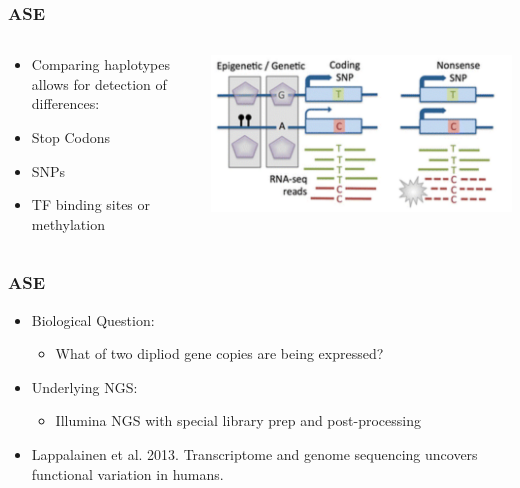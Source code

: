 \documentclass[14pt]{beamer}
\begin{document}
\begin{frame}
\frametitle{ASE}
\begin{columns}
	\begin{column}{0.4\textwidth}
		\begin{itemize}
			\item<+-> Comparing haplotypes allows for detection of differences:
			\item<+-> Stop Codons
			\item<+-> SNPs
			\item<+-> TF binding sites or methylation
		\end{itemize}
		\end{column}
	\begin{column}{0.6\textwidth}
		\begin{center}
     		\includegraphics[width=1\textwidth]{images_20170926_ASE.png}
     	\end{center}
	\end{column}
\end{columns}
\end{frame}

\begin{frame}
\frametitle{ASE}
\begin{itemize}
	\item<+-> Biological Question:
	\begin{itemize}
		\item<+-> What of two dipliod gene copies are being expressed?
	\end{itemize}
	\item<+-> Underlying NGS:
	\begin{itemize}
		\item<+-> Illumina NGS with special library prep and post-processing
	\end{itemize}
	\item<+-> Lappalainen et al. 2013. Transcriptome and genome sequencing uncovers functional variation in humans.
\end{itemize}
\end{frame}
\end{document}
